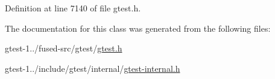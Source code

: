 \-Definition at line 7140 of file gtest.\-h.



\-The documentation for this class was generated from the following files\-:\begin{DoxyCompactItemize}
\item 
gtest-\/1../fused-\/src/gtest/\hyperlink{fused-src_2gtest_2gtest_8h}{gtest.\-h}\item 
gtest-\/1../include/gtest/internal/\hyperlink{gtest-internal_8h}{gtest-\/internal.\-h}\end{DoxyCompactItemize}
